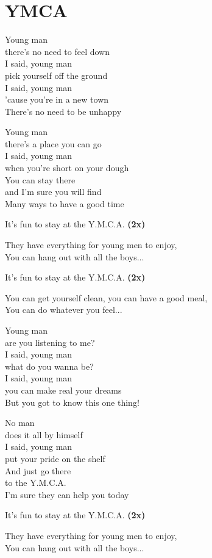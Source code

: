 \section{YMCA}
Young man\\
there's no need to feel down\\
I said, young man\\
pick yourself off the ground\\
I said, young man\\
'cause you're in a new town\\
There's no need to be unhappy

Young man\\
there's a place you can go\\
I said, young man\\
when you're short on your dough\\
You can stay there\\
and I'm sure you will find\\
Many ways to have a good time

It's fun to stay at the Y.M.C.A. \textbf{(2x)}

They have everything for young men to enjoy,\\
You can hang out with all the boys...

It's fun to stay at the Y.M.C.A. \textbf{(2x)}

You can get yourself clean, you can have a good meal,\\
You can do whatever you feel...

Young man\\
are you listening to me?\\
I said, young man\\
what do you wanna be?\\
I said, young man\\
you can make real your dreams\\
But you got to know this one thing!

No man\\
does it all by himself\\
I said, young man\\
put your pride on the shelf\\
And just go there\\
to the Y.M.C.A.\\
I'm sure they can help you today

It's fun to stay at the Y.M.C.A. \textbf{(2x)}

They have everything for young men to enjoy,\\
You can hang out with all the boys...

